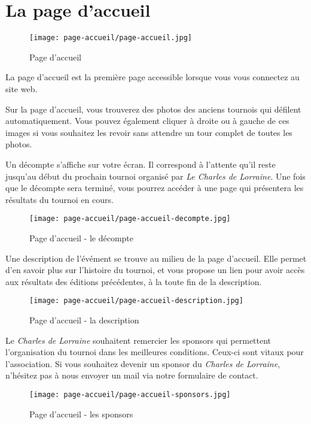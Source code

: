 \section{La page d'accueil}

\begin{figure}[H]
\centering
\texttt{[image: page-accueil/page-accueil.jpg]}
\caption{Page d'accueil}
\end{figure}

La page d'accueil est la première page accessible lorsque vous vous connectez au site web.\newline

Sur la page d'accueil, vous trouverez des photos des anciens tournois qui
défilent automatiquement. Vous pouvez également cliquer à droite ou à gauche
de ces images si vous souhaitez les revoir sans attendre un tour complet de
toutes les photos.\newline

Un décompte s'affiche sur votre écran. Il correspond à l'attente qu'il reste
jusqu'au début du prochain tournoi organisé par \textit{Le Charles de Lorraine}. Une
fois que le décompte sera terminé, vous pourrez accéder à une page qui
présentera les résultats du tournoi en cours.

\begin{figure}[H]
\centering
\texttt{[image: page-accueil/page-accueil-decompte.jpg]}
\caption{Page d'accueil - le décompte}
\end{figure}

Une description de l'évément se trouve au milieu de la page d'accueil. Elle permet d'en savoir plus sur l'histoire du tournoi, et vous
propose un lien pour avoir accès aux résultats des éditions précédentes, à la toute fin de la description.

\begin{figure}[H]
\centering
\texttt{[image: page-accueil/page-accueil-description.jpg]}
\caption{Page d'accueil - la description}
\end{figure}

Le \textit{Charles de Lorraine} souhaitent remercier les sponsors qui permettent
l'organisation du tournoi dans les meilleures conditions. Ceux-ci sont vitaux
pour l'association. Si vous souhaitez devenir un sponsor du \textit{Charles de Lorraine},
n'hésitez pas à nous envoyer un mail via notre formulaire de contact.

\begin{figure}[H]
\centering
\texttt{[image: page-accueil/page-accueil-sponsors.jpg]}
\caption{Page d'accueil - les sponsors}
\end{figure}

